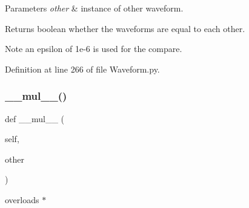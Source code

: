 \begin{DoxyParams}{Parameters}
{\em other} & instance of other waveform. \\
\hline
\end{DoxyParams}
\begin{DoxyReturn}{Returns}
boolean whether the waveforms are equal to each other. 
\end{DoxyReturn}
\begin{DoxyNote}{Note}
an epsilon of 1e-\/6 is used for the compare. 
\end{DoxyNote}


Definition at line 266 of file Waveform.\+py.

\mbox{\label{classSignalIntegrity_1_1TimeDomain_1_1Waveform_1_1Waveform_1_1Waveform_a96fd98a8997501189d60829abc0257cb}} 
\subsubsection{\texorpdfstring{\+\_\+\+\_\+mul\+\_\+\+\_\+()}{\_\_mul\_\_()}}
{\footnotesize\ttfamily def \+\_\+\+\_\+mul\+\_\+\+\_\+ (\begin{DoxyParamCaption}\item[{}]{self,  }\item[{}]{other }\end{DoxyParamCaption})}



overloads $\ast$ 



